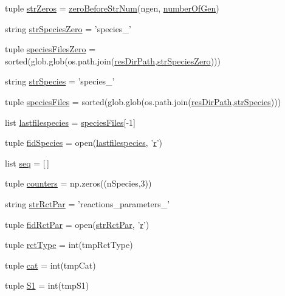 \begin{DoxyCompactItemize}
tuple \hyperlink{a00103_ac53f52471f3cf1ef18465a07dc930dff}{str\-Zeros} = \hyperlink{a00103_ac217c91fe2eee20671291adb12bbbbb2}{zero\-Before\-Str\-Num}(ngen, \hyperlink{a00103_acceae37ca98ccf6dc25c9f538fda386f}{number\-Of\-Gen})
\item 
string \hyperlink{a00103_a78927c369e0fe9deb29777c699af346f}{str\-Species\-Zero} = 'species\-\_\-'
\item 
tuple \hyperlink{a00103_a2f73b228eca2d5d0e45f781ccc21b253}{species\-Files\-Zero} = sorted(glob.\-glob(os.\-path.\-join(\hyperlink{a00103_a2c1728d3ec9815ec7cf41653e953524c}{res\-Dir\-Path},\hyperlink{a00103_a78927c369e0fe9deb29777c699af346f}{str\-Species\-Zero})))
\item 
string \hyperlink{a00103_a7ad6c119fecb41b02823a95f334daa4c}{str\-Species} = 'species\-\_\-'
\item 
tuple \hyperlink{a00103_a7e3b3a6b0c9305e60758bf5d44e7b0f6}{species\-Files} = sorted(glob.\-glob(os.\-path.\-join(\hyperlink{a00103_a2c1728d3ec9815ec7cf41653e953524c}{res\-Dir\-Path},\hyperlink{a00103_a7ad6c119fecb41b02823a95f334daa4c}{str\-Species})))
\item 
list \hyperlink{a00103_ac7070acb2aaeb8965c57e81b6308ddd5}{lastfilespecies} = \hyperlink{a00103_a7e3b3a6b0c9305e60758bf5d44e7b0f6}{species\-Files}\mbox{[}-\/1\mbox{]}
\item 
tuple \hyperlink{a00103_a240d5b3cd72043528f4b674a8ba00a33}{fid\-Species} = open(\hyperlink{a00103_ac7070acb2aaeb8965c57e81b6308ddd5}{lastfilespecies}, '\hyperlink{a00031_ac862e7284527eb913b1351c8bfb8e079}{r}')
\item 
list \hyperlink{a00103_a50a8f7f4bae0fd037961d91206f5178c}{seq} = \mbox{[}$\,$\mbox{]}
\item 
tuple \hyperlink{a00103_a6afffdd046bbc3bc4fbee34b561fcae5}{counters} = np.\-zeros((n\-Species,3))
\item 
string \hyperlink{a00103_ab59af27efe5462ef13ae45fd7330d0b3}{str\-Rct\-Par} = 'reactions\-\_\-parameters\-\_\-'
\item 
tuple \hyperlink{a00103_a64247b23c199d0b0d0d60f02ec8682e3}{fid\-Rct\-Par} = open(\hyperlink{a00103_ab59af27efe5462ef13ae45fd7330d0b3}{str\-Rct\-Par}, '\hyperlink{a00031_ac862e7284527eb913b1351c8bfb8e079}{r}')
\item 
tuple \hyperlink{a00103_abdc37f53b75138949fbbe9f9e42f1e6f}{rct\-Type} = int(tmp\-Rct\-Type)
\item 
tuple \hyperlink{a00103_a721a520fa04949579e29cb858dc00bf0}{cat} = int(tmp\-Cat)
\item 
tuple \hyperlink{a00103_a4ffac9566fa24baa2b27ccd97f9ffe1e}{S1} = int(tmp\-S1)

\end{DoxyCompactItemize}
